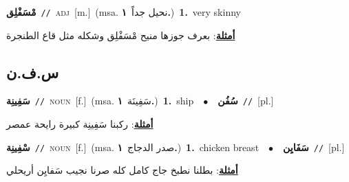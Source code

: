 \documentclass[10pt,a4paper,twoside]{article} %
\begin{document}
\begin{multicols}{2}
{\setlength\topsep{0pt}\textbf{\foreignlanguage{arabic}{مْسَفْلِق}}\ {\color{gray}\texttt{//}\color{black}}\ \textsc{adj}\ [m.]\ \color{gray}(msa. \foreignlanguage{arabic}{نحيل جداً}~\foreignlanguage{arabic}{\textbf{١.}})\color{black}\ \textbf{1.}~very skinny\  \begin{flushright}\color{gray}\foreignlanguage{arabic}{\textbf{\underline{\foreignlanguage{arabic}{أمثلة}}}: بعرف جوزها منيح مْسَفْلِق وشكله مثل قاع الطنجرة}\end{flushright}\color{black}} \vspace{2mm}

\vspace{-3mm}
\subsection*{\color{blue}\foreignlanguage{arabic}{س.ف.ن}\color{blue}{}} 

{\setlength\topsep{0pt}\textbf{\foreignlanguage{arabic}{سَفِينِة}}\ {\color{gray}\texttt{//}\color{black}}\ \textsc{noun}\ [f.]\ \color{gray}(msa. \foreignlanguage{arabic}{سَفِينَة}~\foreignlanguage{arabic}{\textbf{١.}})\color{black}\ \textbf{1.}~ship\ \ $\bullet$\ \ \setlength\topsep{0pt}\textbf{\foreignlanguage{arabic}{سُفُن}}\ {\color{gray}\texttt{//}\color{black}}\ [pl.]\  \begin{flushright}\color{gray}\foreignlanguage{arabic}{\textbf{\underline{\foreignlanguage{arabic}{أمثلة}}}: ركبنا سَفِينِة كبيرة رايحة عمصر}\end{flushright}\color{black}} \vspace{2mm}

{\setlength\topsep{0pt}\textbf{\foreignlanguage{arabic}{سْفِينِة}}\ {\color{gray}\texttt{//}\color{black}}\ \textsc{noun}\ [f.]\ \color{gray}(msa. \foreignlanguage{arabic}{صدر الدجاج}~\foreignlanguage{arabic}{\textbf{١.}})\color{black}\ \textbf{1.}~chicken breast\ \ $\bullet$\ \ \setlength\topsep{0pt}\textbf{\foreignlanguage{arabic}{سَفَايِن}}\ {\color{gray}\texttt{//}\color{black}}\ [pl.]\  \begin{flushright}\color{gray}\foreignlanguage{arabic}{\textbf{\underline{\foreignlanguage{arabic}{أمثلة}}}: بطلنا نطبخ جاج كامل كله صرنا نجيب سَفايِن أريحلي}\end{flushright}\color{black}} \vspace{2mm}


\end{multicols}
\end{document}
